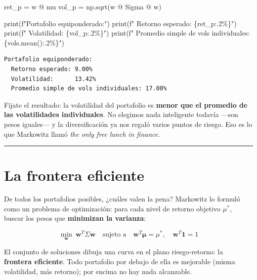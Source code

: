 \documentclass[
  spanish,
  letterpaper,
  DIV=11,
  numbers=noendperiod]{scrreprt}
\newenvironment{Shaded}{\begin{snugshade}}{\end{snugshade}}
\newcommand{\BuiltInTok}[1]{\textcolor[rgb]{0.00,0.23,0.31}{#1}}
\newcommand{\NormalTok}[1]{\textcolor[rgb]{0.00,0.23,0.31}{#1}}
\newcommand{\OperatorTok}[1]{\textcolor[rgb]{0.37,0.37,0.37}{#1}}
\newcommand{\SpecialCharTok}[1]{\textcolor[rgb]{0.37,0.37,0.37}{#1}}
\newcommand{\SpecialStringTok}[1]{\textcolor[rgb]{0.13,0.47,0.30}{#1}}
\begin{document}
\begin{Shaded}
\begin{Highlighting}[]
\NormalTok{ret\_p }\OperatorTok{=}\NormalTok{ w }\OperatorTok{@}\NormalTok{ mu}
\NormalTok{vol\_p }\OperatorTok{=}\NormalTok{ np.sqrt(w }\OperatorTok{@}\NormalTok{ Sigma }\OperatorTok{@}\NormalTok{ w)}

\BuiltInTok{print}\NormalTok{(}\SpecialStringTok{f"Portafolio equiponderado:"}\NormalTok{)}
\BuiltInTok{print}\NormalTok{(}\SpecialStringTok{f"  Retorno esperado: }\SpecialCharTok{\{}\NormalTok{ret\_p}\SpecialCharTok{:.2\%\}}\SpecialStringTok{"}\NormalTok{)}
\BuiltInTok{print}\NormalTok{(}\SpecialStringTok{f"  Volatilidad:      }\SpecialCharTok{\{}\NormalTok{vol\_p}\SpecialCharTok{:.2\%\}}\SpecialStringTok{"}\NormalTok{)}
\BuiltInTok{print}\NormalTok{(}\SpecialStringTok{f"  Promedio simple de vols individuales: }\SpecialCharTok{\{}\NormalTok{vols}\SpecialCharTok{.}\NormalTok{mean()}\SpecialCharTok{:.2\%\}}\SpecialStringTok{"}\NormalTok{)}
\end{Highlighting}
\end{Shaded}

\begin{verbatim}
Portafolio equiponderado:
  Retorno esperado: 9.00%
  Volatilidad:      13.42%
  Promedio simple de vols individuales: 17.00%
\end{verbatim}

Fijate el resultado: la volatilidad del portafolio es \textbf{menor que
el promedio de las volatilidades individuales}. No elegimos nada
inteligente todavía ---son pesos iguales--- y la diversificación ya nos
regaló varios puntos de riesgo. Eso es lo que Markowitz llamó \emph{the
only free lunch in finance}.

\begin{center}\rule{0.5\linewidth}{0.5pt}\end{center}

\chapter{La frontera eficiente}\label{la-frontera-eficiente}

De todos los portafolios posibles, ¿cuáles valen la pena? Markowitz lo
formuló como un problema de optimización: para cada nivel de retorno
objetivo \(\mu^*\), buscar los pesos que \textbf{minimizan la varianza}:

\[\min_{\mathbf{w}} \ \mathbf{w}^T \Sigma \mathbf{w} \quad \text{sujeto a} \quad \mathbf{w}^T \boldsymbol{\mu} = \mu^*, \quad \mathbf{w}^T \mathbf{1} = 1\]

El conjunto de soluciones dibuja una curva en el plano riesgo-retorno:
la \textbf{frontera eficiente}. Todo portafolio por debajo de ella es
mejorable (misma volatilidad, más retorno); por encima no hay nada
alcanzable.
\end{document}
